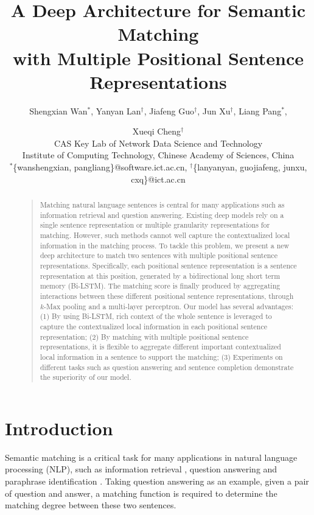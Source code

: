 \documentclass[letterpaper]{article}
\begin{document}
%
\title{A Deep Architecture for Semantic Matching \\with Multiple Positional Sentence Representations}
\author{Shengxian Wan$^{*}$, Yanyan Lan$^\dag$, Jiafeng Guo$^\dag$, Jun Xu$^\dag$, Liang Pang$^{*}$, \and Xueqi Cheng$^\dag$\\
CAS Key Lab of Network Data Science and Technology\\
Institute of Computing Technology, Chinese Academy of Sciences, China\\
$^*$\{wanshengxian, pangliang\}@software.ict.ac.cn, $^\dag$\{lanyanyan, guojiafeng, junxu, cxq\}@ict.ac.cn \\
}
\maketitle
\begin{abstract}
\begin{quote}
Matching natural language sentences is central for many applications such as information retrieval and question answering.
Existing deep models rely on a single sentence representation or multiple granularity representations for matching. However, such methods cannot well capture the contextualized local information in the matching process. To tackle this problem, we present a new deep architecture to match two sentences with multiple positional sentence representations. Specifically, each positional sentence representation is a sentence representation at this position, generated by a bidirectional long short term memory (Bi-LSTM). The matching score is finally produced by aggregating interactions between these different positional sentence representations, through $k$-Max pooling and a multi-layer perceptron. Our model has several advantages: (1) By using Bi-LSTM, rich context of the whole sentence is leveraged to capture the contextualized local information in each positional sentence representation; (2) By matching with multiple positional sentence representations, it is flexible to aggregate different important contextualized local information in a sentence to support the matching; (3) Experiments on different tasks such as  question answering and sentence completion demonstrate the superiority of our model.
\end{quote}
\end{abstract}

\section{Introduction}
Semantic matching is a critical task for many applications in natural language processing (NLP), such as information retrieval \cite{INR-035}, question answering \cite{Berger:2000:BLC:345508.345576} and paraphrase identification \cite{dolan2004unsupervised}.
Taking question answering as an example, given a pair of question and answer, a matching function is required to determine the matching degree between these two sentences.
\end{document}
